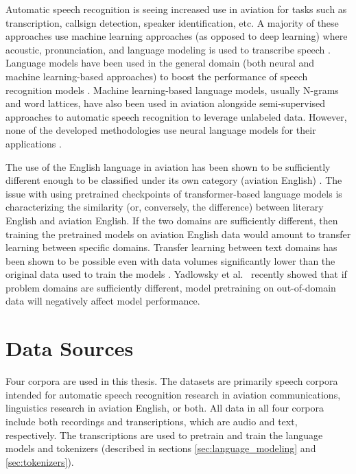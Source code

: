 \documentclass[12pt]{article}
\begin{document}
Automatic speech recognition is seeing increased use in aviation for tasks such as transcription, callsign detection, speaker identification, etc. A
majority of these approaches use machine learning approaches (as opposed to deep learning) where acoustic, pronunciation, and language modeling is
used to transcribe speech
\cite{guo_comparative_2022,smidl_air_2019,zuluaga-gomez_automatic_2020,badrinath_automatic_2022,hofbauer_atcosim_2008,helmke_quantifying_2017}.
Language models have been used in the general domain (both neural and machine learning-based approaches) to boost the performance of speech
recognition models \cite{han_contextnet_2020,kriman_quartznet_2020,majumdar_citrinet_2021}. Machine learning-based language models, usually N-grams
and word lattices, have also been used in aviation alongside semi-supervised approaches to automatic speech recognition to leverage unlabeled data.
However, none of the developed methodologies use neural language models for their applications
\cite{zuluaga-gomez_contextual_2021,srinivasamurthy_semi-supervised_2017,badrinath_automatic_2022}.

The use of the English language in aviation has been shown to be sufficiently different enough to be classified under its own category (aviation English) \cite{paltridge_handbook_2013}. The issue with using pretrained checkpoints of transformer-based language models is characterizing the similarity (or, conversely, the difference) between literary English and aviation English. If the two domains are sufficiently different, then training the pretrained models on aviation English data would amount to transfer learning between specific domains. Transfer learning between text domains has been shown to be possible even with data volumes significantly lower than the original data used to train the models \cite{raffel_exploring_2020}. Yadlowsky et al.~\cite{yadlowsky_pretraining_2023} recently showed that if problem domains are sufficiently different, model pretraining on out-of-domain data will negatively affect model performance.

\section{Data Sources}\label{sec:data_source}
Four corpora are used in this thesis. The datasets are primarily speech corpora intended for automatic speech recognition research in aviation communications, linguistics research in aviation English, or both. All data in all four corpora include both recordings and transcriptions, which are audio and text, respectively. The transcriptions are used to pretrain and train the language models and tokenizers (described in sections \ref{sec:language_modeling} and \ref{sec:tokenizers}).
\end{document}
